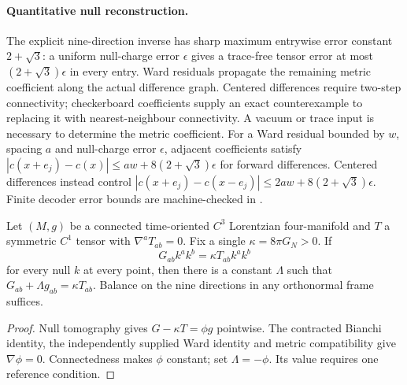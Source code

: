 \documentclass[11pt]{article}
\begin{document}
\paragraph{Quantitative null reconstruction.}
The explicit nine-direction inverse has sharp maximum entrywise error
constant $2+\sqrt3$: a uniform null-charge error $\epsilon$ gives a
trace-free tensor error at most $(2+\sqrt3)\epsilon$ in every entry.
Ward residuals propagate the remaining metric coefficient along the actual
difference graph. Centered differences require two-step connectivity;
checkerboard coefficients supply an exact counterexample to replacing it
with nearest-neighbour connectivity. A vacuum or trace input is
necessary to determine the metric coefficient.
For a Ward residual bounded by $w$, spacing $a$ and null-charge error
$\epsilon$, adjacent coefficients satisfy
$|c(x+e_j)-c(x)|\leq aw+8(2+\sqrt3)\epsilon$ for forward differences.
Centered differences instead control
$|c(x+e_j)-c(x-e_j)|\leq2aw+8(2+\sqrt3)\epsilon$.
Finite decoder error bounds are machine-checked in
.

\begin{theorem}
Let $(M,g)$ be a connected time-oriented $C^3$ Lorentzian four-manifold and
$T$ a symmetric $C^1$ tensor with $\nabla^aT_{ab}=0$. Fix a single
$\kappa=8\pi G_N>0$. If
\[
 G_{ab}k^ak^b=\kappa T_{ab}k^ak^b
\]
for every null $k$ at every point, then there is a constant $\Lambda$ such
that $G_{ab}+\Lambda g_{ab}=\kappa T_{ab}$.
Balance on the nine directions in any orthonormal frame suffices.
\end{theorem}
\begin{proof}
Null tomography gives $G-\kappa T=\phi g$ pointwise. The contracted Bianchi
identity, the independently supplied Ward identity and metric compatibility
give $\nabla\phi=0$. Connectedness makes $\phi$ constant; set
$\Lambda=-\phi$. Its value requires one reference condition.
\end{proof}
\end{document}
